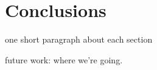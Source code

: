 \chapter{Conclusions}
\label{conclusionschap}


one short paragraph about each section

future work: where we're going.